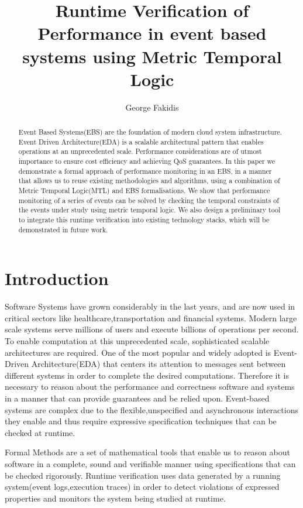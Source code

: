 \documentclass[twocolumn]{article}
\title{Runtime Verification of Performance in event based systems using Metric Temporal Logic}
\author[1]{George Fakidis}
\affil[1]{Athens University of Economics and Business}
\begin{document}
\maketitle
\begin{abstract}
	Event Based Systems(EBS) are the foundation of modern cloud system infrastructure. Event Driven Architecture(EDA) is a scalable architectural pattern that enables operations at an unprecedented scale. Performance considerations are of utmost importance to ensure cost efficiency and achieving QoS guarantees.
	In this paper we demonstrate a formal approach of performance monitoring in an EBS, in a manner that allows us to reuse existing methodologies and algorithms, using a combination of Metric Temporal Logic(MTL) and EBS formalisations.
	We show that performance monitoring of a series of events can be solved by checking the temporal constraints of the events under study using metric temporal logic.
	We also design a preliminary tool to integrate this runtime verification into existing technology stacks, which will be demonstrated in future work.
\end{abstract}


\section{Introduction}

Software Systems have grown considerably in the last years, and are now used in critical sectors like healthcare,transportation and financial systems.
Modern large scale systems serve millions of users and execute billions of operations per second.
To enable computation at this unprecedented scale, sophisticated scalable architectures are required.
One of the most popular and widely adopted is Event-Driven Architecture(EDA) that centers its attention to messages sent between different systems in order to complete the desired computations.
Therefore it is necessary to reason about the performance and correctness software and systems in a manner that can provide guarantees and be relied upon. Event-based systems are complex due to the flexible,unspecified and asynchronous interactions they enable and thus require expressive specification techniques that can be checked at runtime.
\par
Formal Methods are a set of mathematical tools that enable us to reason about software in a complete, sound and verifiable manner using specifications that can be checked rigorously. Runtime verification uses data generated by a running system(event logs,execution traces) in order to detect violations of expressed properties and monitors the system being studied at runtime.
\end{document}
